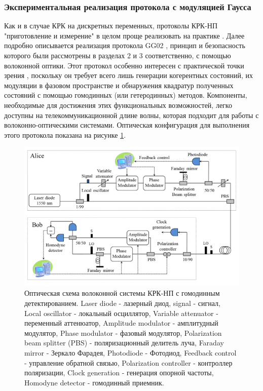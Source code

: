 \subsubsection{Экспериментальная реализация протокола с модуляцией Гаусса} \label{GG02 exp lit}
Как и в случае КРК на дискретных переменных, протоколы КРК-НП "приготовление и измерение" в целом проще реализовать на практике \cite{diamanti2015}. Далее подробно описывается реализация протокола GG02 \cite{grosshans2002}, принцип и безопасность которого были рассмотрены в разделах 2 и 3 соответственно, с помощью волоконной оптики. Этот протокол особенно интересен с практической точки зрения \cite{fossier2009}, поскольку он требует всего лишь генерации когерентных состояний, их модуляции в фазовом пространстве и обнаружения квадратур полученных состояний с помощью гомодинных (или гетеродинных) методов. Компоненты, необходимые для достижения этих функциональных возможностей, легко доступны на телекоммуникационной длине волны, которая подходит для работы с волоконно-оптическими системами. Оптическая конфигурация для выполнения этого протокола показана на рисунке \ref{fig:gg02 lit}.
\begin{figure}
    \centering
    \includegraphics[width=\linewidth]{images/gg02 lit.png}
    \caption{Оптическая схема волоконной системы КРК-НП с гомодинным детектированием. Laser diode - лазерный диод, signal - сигнал, Local oscillator - локальный осциллятор, Variable attenuator - переменный аттенюатор, Amplitude modulator - амплитудный модулятор, Phase modulator - фазовый модулятор, Polarization beam splitter (PBS) - поляризационный делитель луча, Faraday mirror - Зеркало Фарадея, Photodiode - Фотодиод, Feedback control - управление обратной связью, Polarization controller - контроллер поляризации, Clock generation - генерация опорной частоты, Homodyne detector - гомодинный приемник.}
    \label{fig:gg02 lit}
\end{figure}
